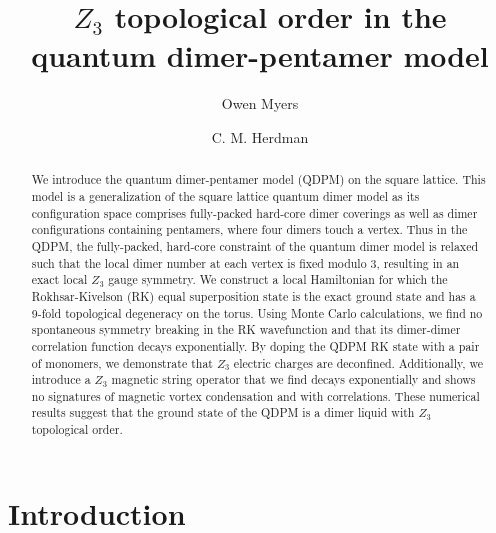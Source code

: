 \documentclass[twocolumn,prb,aps,floatfix,superscriptaddress]{revtex4-1}
\begin{document}
\title{$Z_3$ topological order in the quantum dimer-pentamer model}

\author{Owen Myers}

\author{C. M. Herdman}

\begin{abstract}
We introduce the quantum dimer-pentamer model (QDPM) on the square lattice. This model is a generalization of the square lattice quantum dimer model as its configuration space comprises fully-packed hard-core dimer coverings as well as dimer configurations containing pentamers, where four dimers touch a vertex. Thus in the QDPM, the fully-packed, hard-core constraint of the quantum dimer model is relaxed such that the local dimer number at each vertex is fixed modulo 3, resulting in an exact local $Z_3$ gauge symmetry. We construct a local Hamiltonian for which the Rokhsar-Kivelson (RK) equal superposition state is the exact ground state and has a 9-fold topological degeneracy on the torus. Using Monte Carlo calculations, we find no spontaneous symmetry breaking in the RK wavefunction and that its dimer-dimer correlation function decays exponentially. By doping the QDPM RK state with a pair of monomers, we demonstrate that $Z_3$ electric charges are deconfined. Additionally, we introduce a $Z_3$ magnetic string operator that we find decays exponentially and shows no signatures of magnetic vortex condensation and with correlations. These numerical results suggest that the ground state of the QDPM is a dimer liquid with $Z_3$ topological order.
\end{abstract}

\maketitle

\section{Introduction}
\end{document}
